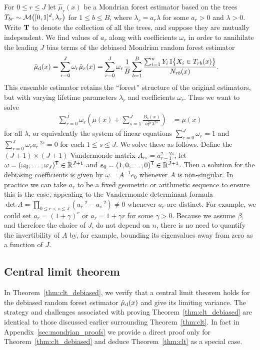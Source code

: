 For $0 \leq r \leq J$ let $\hat \mu_r(x)$ be a Mondrian forest estimator
based on the trees
$T_{b r} \sim \mathcal{M}\big([0,1]^d, \lambda_r \big)$
for $1 \leq b \leq B$, where $\lambda_r = a_r \lambda$ for some $a_r > 0$
and $\lambda > 0$.
Write $\mathbf{T}$ to denote the collection of all the trees,
and suppose they are mutually independent.
We find values of $a_r$
along with coefficients $\omega_r$ in order
to annihilate the leading $J$ bias terms of the
debiased Mondrian random forest estimator
%
\begin{align}
  \label{eq:debiased}
  \hat \mu_{\mathrm{d}}(x)
  &=
  \sum_{r=0}^J
  \omega_r \hat \mu_r(x)
  = \sum_{r=0}^{J}
  \omega_r
  \frac{1}{B}
  \sum_{b=1}^B
  \frac{\sum_{i=1}^n Y_i \,
  \mathbb{I}\big\{ X_i \in T_{r b}(x) \big\}}
  {N_{r b}(x)}.
\end{align}
%
This ensemble estimator retains the ``forest'' structure
of the original estimators,
but with varying lifetime parameters $\lambda_r$ and coefficients $\omega_r$.
Thus we want to solve
%
\begin{align*}
  \sum_{r=0}^{J}
  \omega_r
  \left(
    \mu(x)
    + \sum_{s=1}^{J}
    \frac{B_{s}(x)}{a_r^{2s} \lambda^{2s}}
  \right)
  &= \mu(x)
\end{align*}
%
for all $\lambda$, or equivalently the system of linear equations
$\sum_{r=0}^{J} \omega_r = 1$
and $\sum_{r=0}^{J} \omega_r a_r^{-2s} = 0$
for each $1 \leq s \leq J$.
We solve these as follows.
Define the $(J+1) \times (J+1)$ Vandermonde matrix
$A_{r s} = a_{r-1}^{2-2s}$,
let $\omega = (\omega_0, \ldots, \omega_J)^{\mathsf{T}} \in \mathbb{R}^{J+1}$
and $e_0 = (1, 0, \ldots, 0)^{\mathsf{T}} \in \mathbb{R}^{J+1}$.
Then a solution for the debiasing coefficients is given by
$\omega = A^{-1} e_0$ whenever $A$ is non-singular.
In practice we can take $a_r$ to be a fixed geometric or arithmetic sequence
to ensure this is the case,
appealing to the Vandermonde determinant formula
$\det A = \prod_{0 \leq r < s \leq J} (a_r^{-2} - a_s^{-2})
\neq 0$ whenever $a_r$ are distinct.
For example, we could set
$a_r = (1 + \gamma)^r$ or $a_r = 1 + \gamma r$ for some $\gamma > 0$.
Because we assume $\beta$, and therefore the choice of $J$, do not
depend on $n$, there is no need to quantify
the invertibility of $A$ by, for example, bounding its eigenvalues
away from zero as a function of $J$.

\subsection{Central limit theorem}

In Theorem~\ref{thm:clt_debiased}, we verify that a central
limit theorem holds for the debiased
random forest estimator $\hat\mu_{\mathrm{d}}(x)$ and give its limiting variance.
The strategy and challenges associated with proving
Theorem~\ref{thm:clt_debiased} are identical to those discussed earlier
surrounding Theorem~\ref{thm:clt}.
In fact in Appendix~\ref{sec:mondrian_proofs}
we provide a direct proof only for Theorem~\ref{thm:clt_debiased}
and deduce Theorem~\ref{thm:clt} as a special case.

